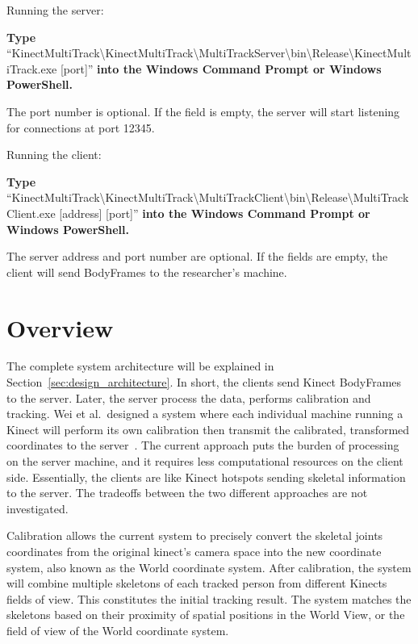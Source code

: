 Running the server:

\textbf{Type} ``KinectMultiTrack\textbackslash{KinectMultiTrack}\textbackslash{MultiTrackServer}\textbackslash{bin}\textbackslash{Release}\textbackslash{KinectMultiTrack}.exe [port]'' \textbf{into the Windows Command Prompt or Windows PowerShell.}

The port number is optional. If the field is empty, the server will start listening for connections at port 12345.

Running the client:

\textbf{Type} ``KinectMultiTrack\textbackslash{KinectMultiTrack}\textbackslash{MultiTrackClient}\textbackslash{bin}\textbackslash{Release}\textbackslash{MultiTrackClient}.exe [address] [port]'' \textbf{into the Windows Command Prompt or Windows PowerShell.}

The server address and port number are optional. If the fields are empty, the client will send BodyFrames to the researcher's machine.

\section{Overview}
\label{sec:current_approach_overview}

The complete system architecture will be explained in Section~\ref{sec:design_architecture}. In short, the clients send Kinect BodyFrames to the server. Later, the server process the data, performs calibration and tracking. Wei et al.\ designed a system where each individual machine running a Kinect will perform its own calibration then transmit the calibrated, transformed coordinates to the server~\cite{wei_kinect_calibration}. The current approach puts the burden of processing on the server machine, and it requires less computational resources on the client side. Essentially, the clients are like Kinect hotspots sending skeletal information to the server. The tradeoffs between the two different approaches are not investigated.

Calibration allows the current system to precisely convert the skeletal joints coordinates from the original kinect's camera space into the new coordinate system, also known as the World coordinate system. After calibration, the system will combine multiple skeletons of each tracked person from different Kinects fields of view. This constitutes the initial tracking result. The system matches the skeletons based on their proximity of spatial positions in the World View, or the field of view of the World coordinate system.

